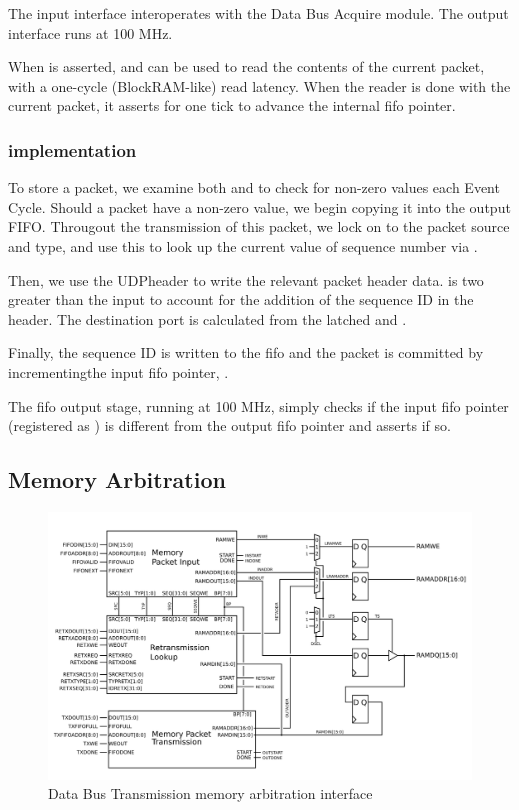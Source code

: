 The input interface interoperates with the Data Bus Acquire module.
The output interface runs at 100 MHz. 

When  is asserted,  and
 can be used to read the contents of the current
packet, with a one-cycle (BlockRAM-like) read latency. When the reader
is done with the current packet, it asserts  for one
tick to advance the internal fifo pointer.


\subsubsection{implementation}
To store a packet, we examine both  and
 to check for non-zero values each Event Cycle.
Should a packet have a non-zero value, we begin copying it into the
output FIFO. Througout the transmission of this packet, we lock on to
the packet source and type, and use this to look up the current value
of sequence number via  .

Then, we use the UDPheader to write the relevant packet header data.
 is two greater than the input  to
account for the addition of the sequence ID in the header. The
destination port is calculated from the latched  and
.

Finally, the sequence ID is written to the fifo and the packet is
committed by incrementingthe input fifo pointer, .

The fifo output stage, running at 100 MHz, simply checks if the input
fifo pointer (registered as ) is different from the
output fifo pointer and asserts  if so.

\subsection{Memory Arbitration}
\begin{figure}
\begin{centering}
\includegraphics[scale=0.8]{data.memarbit.svg}
\end{centering}
\caption{Data Bus Transmission memory arbitration interface}
\label{data.memarbit}
\end{figure}

